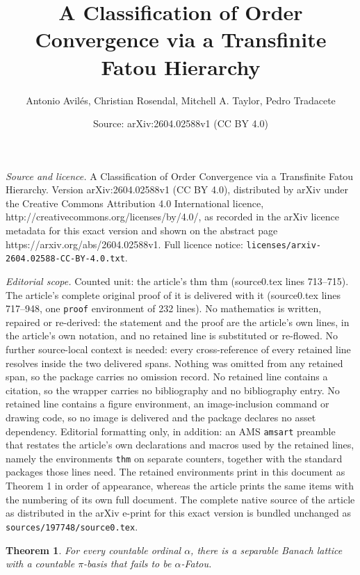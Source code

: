 \documentclass[10pt,a4paper]{amsart}
\title{A Classification of Order Convergence via a Transfinite Fatou Hierarchy}
\author{Antonio Avil\'es, Christian Rosendal, Mitchell A. Taylor, Pedro Tradacete}
\date{Source: arXiv:2604.02588v1 (CC BY 4.0)}
\newtheorem{thm}{Theorem}
\begin{document}
\maketitle

\noindent\emph{Source and licence.} A Classification of Order Convergence via a Transfinite Fatou Hierarchy. Version arXiv:2604.02588v1 (CC BY 4.0), distributed by arXiv under the Creative Commons Attribution 4.0 International licence, http://creativecommons.org/licenses/by/4.0/, as recorded in the arXiv licence metadata for this exact version and shown on the abstract page https://arxiv.org/abs/2604.02588v1. Full licence notice: \texttt{licenses/arxiv-2604.02588-CC-BY-4.0.txt}.\par\smallskip

\noindent\textit{Editorial scope.} Counted unit: the article's thm thm (source0.tex lines 713--715). The article's complete original proof of it is delivered with it (source0.tex lines 717--948, one \texttt{proof} environment of 232 lines). No mathematics is written, repaired or re-derived: the statement and the proof are the article's own lines, in the article's own notation, and no retained line is substituted or re-flowed.  No further source-local context is needed: every cross-reference of every retained line resolves inside the two delivered spans.  Nothing was omitted from any retained span, so the package carries no omission record.  No retained line contains a citation, so the wrapper carries no bibliography and no bibliography entry.  No retained line contains a figure environment, an image-inclusion command or drawing code, so no image is delivered and the package declares no asset dependency.  Editorial formatting only, in addition: an AMS \texttt{amsart} preamble that restates the article's own declarations and macros used by the retained lines, namely the environments \texttt{thm} on separate counters, together with the standard packages those lines need.  The retained environments print in this document as Theorem 1 in order of appearance, whereas the article prints the same items with the numbering of its own full document.  The complete native source of the article as distributed in the arXiv e-print for this exact version is bundled unchanged as \texttt{sources/197748/source0.tex}.
\begin{thm} 
For every countable ordinal $\alpha$, there is a separable Banach lattice with a countable $\pi$-basis that fails to be $\alpha$-Fatou.
\end{thm}
\end{document}
